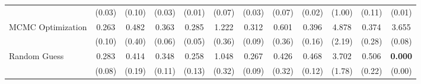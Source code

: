 \begin{table}[ht]
{\begin{tabular}{l cccc cccc cc c}
             & (0.03) & (0.10) & (0.03) & (0.01) & (0.07) & (0.03) & (0.07) & (0.02) & (1.00) & (0.11) & (0.01) \\
            \addlinespace[0.2em]
            MCMC Optimization & 0.263 & 0.482 & 0.363 & 0.285 & 1.222 & 0.312 & 0.601 & 0.396 & 4.878 & 0.374 & 3.655 \\
             & (0.10) & (0.40) & (0.06) & (0.05) & (0.36) & (0.09) & (0.36) & (0.16) & (2.19) & (0.28) & (0.08) \\
            \addlinespace[0.2em]
            Random Guess & 0.283 & 0.414 & 0.348 & 0.258 & 1.048 & 0.267 & 0.426 & 0.468 & 3.702 & 0.506 & \textbf{0.000} \\
             & (0.08) & (0.19) & (0.11) & (0.13) & (0.32) & (0.09) & (0.32) & (0.12) & (1.78) & (0.22) & (0.00) \\
            \bottomrule
        \end{tabular}%
    }
\end{table}